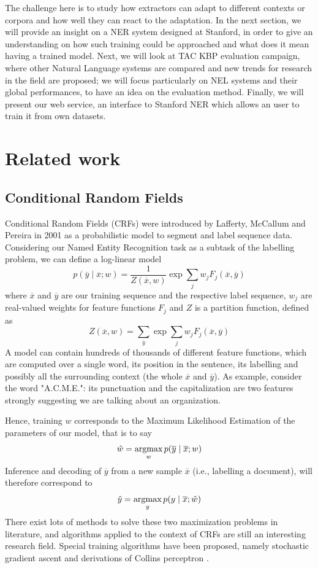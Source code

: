 \documentclass[a4paper,11pt]{report}
\newcommand{\argmax}{\operatornamewithlimits{argmax}}
\begin{document}
The challenge here is to study how extractors can adapt to different contexts or corpora and how well they can react to the adaptation. In the next section, we will provide an insight on a NER system designed at Stanford, in order to give an understanding on how such training could be approached and what does it mean having a trained model. Next, we will look at TAC KBP evaluation campaign, where other Natural Language systems are compared and new trends for research in the field are proposed; we will focus particularly on NEL systems and their global performances, to have an idea on the evaluation method. Finally, we will present our web service, an interface to Stanford NER which allows an user to train it from own datasets.

\chapter{Related work}

\section{Conditional Random Fields}
\label{sec:crfs}
Conditional Random Fields (CRFs) were introduced by Lafferty, McCallum and Pereira in 2001\cite{lafferty2001conditional} as a probabilistic model to segment and label sequence data. Considering our Named Entity Recognition task as a subtask of the labelling problem, we can define a log-linear model
$$
p(\overline{y} \mid \overline{x}; w) = \frac{1}{Z(\overline{x}, w)}\exp\sum\limits_j w_jF_j(\overline{x}, \overline{y})
$$
where $\overline{x}$ and $\overline{y}$ are our training sequence and the respective label sequence, $w_j$ are real-valued weights for feature functions $F_j$ and $Z$ is a partition function, defined as
$$
Z(\overline{x}, w) = \sum\limits_{\overline{y}}\exp\sum\limits_j w_jF_j(\overline{x}, \overline{y})
$$
A model can contain hundreds of thousands of different feature functions, which are computed over a single word, its position in the sentence, its labelling and possibly all the surrounding context (the whole $\overline{x}$ and $\overline{y}$). As example, consider the word "A.C.M.E.": its punctuation and the capitalization are two features strongly suggesting we are talking about an organization.

Hence, training $w$ corresponds to the Maximum Likelihood Estimation of the parameters of our model, that is to say
$$
\hat{w} = \argmax_w p(\overline{y} \mid \overline{x}; w)
$$
Inference and decoding of $\overline{y}$ from a new sample $\overline{x}$ (i.e., labelling a document), will therefore correspond to
$$
\hat{y} = \argmax_y p(y \mid \overline{x}; \hat{w})
$$
There exist lots of methods to solve these two maximization problems in literature, and algorithms applied to the context of CRFs are still an interesting research field. Special training algorithms have been proposed, namely stochastic gradient ascent and derivations of Collins perceptron \cite{elkan2008log}.
\end{document}
